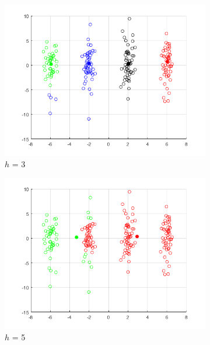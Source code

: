 \documentclass[12pt]{article}
\begin{document}
\begin{figure}[H]
\medskip
\begin{subfigure}{0.25\textwidth}
  \includegraphics[width=\linewidth]{figs/1-b-meanshift-b.png}
  \caption{$h$ = 3}
  \label{fig:4}
\end{subfigure}\hfil %
\begin{subfigure}{0.25\textwidth}
  \includegraphics[width=\linewidth]{figs/1-b-meanshift-b-5.png}
  \caption{$h$ = 5}
  \label{fig:5}
\end{subfigure}\hfil %
\begin{subfigure}{0.25\textwidth}

\end{subfigure}
\end{figure}
\end{document}
